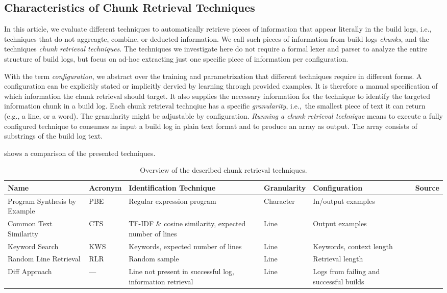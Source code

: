 \subsection{Characteristics of Chunk Retrieval Techniques}
\label{sec:blirt}
In this article, we evaluate different techniques to automatically
retrieve pieces of information that appear literally in the build
logs, i.e., techniques that do not aggreagte, combine, or deducted
information.
We call such pieces of information from build logs
\emph{chunks}, and the techniques \emph{chunk retrieval techniques}.
The techniques we investigate here do not require a formal lexer and
parser to analyze the entire structure of build logs, but focus on
ad-hoc extracting just one specific piece of information per
configuration.

With the term \textit{configuration}, we abstract over the training
and parametrization that different techniques require in different
forms.
A configuration can be explicitly stated or implicitly dervied
by learning through provided examples.
It is therefore a manual
specification of which information the chunk retrieval should target.
It also supplies the necessary information for the technique to
identify the targeted information chunk in a build log.
Each chunk
retrieval technqiue has a specific \textit{granularity}, i.e.,\ the
smallest piece of text it can return (e.g., a line, or a word).
The
granularity might be adjustable by configuration.
\emph{Running a
chunk retrieval technique} means to execute a fully configured
technique to consumes as input a build log in plain text format and to
produce an array as output.
The array consists of substrings of the
build log text.

 shows a comparison of the presented techniques.

\begin{table}[]
\centering
\caption{Overview of the described chunk retrieval techniques.}
\begin{tabularx}{\textwidth}{@{}XlXlXX@{}}
\toprule
Name			     & Acronym & Identification Technique
& Granularity & Configuration & Source		  \\
\midrule
Program Synthesis by Example & PBE     & Regular expression program
& Character   & In/output examples	\\
Common Text Similarity	     & CTS     & TF-IDF \& cosine similarity,
expected number of lines & Line        & Output examples	   \\
Keyword Search		     & KWS     & Keywords, expected number of
lines			 & Line        & Keywords, context length  \\
Random Line Retrieval	     & RLR     & Random sample
& Line	      & Retrieval length	  \\
Diff Approach		     & ---     & Line not present in successful
log, information retrieval  & Line	  & Logs from failing and
successful builds      \\
\bottomrule
\end{tabularx}
\label{tab:ctr}
\end{table}

